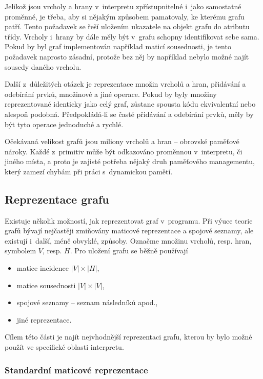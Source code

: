 \documentclass[11pt,twoside,a4paper]{book}
\begin{document}
Jelikož jsou vrcholy a hrany v~interpretu zpřístupnitelné i~jako samostatné proměnné, je třeba, aby si nějakým způsobem pamatovaly, ke kterému grafu patří. Tento požadavek se řeší uložením ukazatele na objekt grafu do atributu třídy. Vrcholy i~hrany by dále měly být v~grafu schopny identifikovat sebe sama. Pokud by byl graf implementován například maticí sousednosti, je tento požadavek naprosto zásadní, protože bez něj by například nebylo možné najít sousedy daného vrcholu.

Další z~důležitých otázek je reprezentace množin vrcholů a hran, přidávání a odebírání prvků, množinové a jiné operace. Pokud by byly množiny reprezentované identicky jako celý graf, zůstane spousta kódu ekvivalentní nebo alespoň podobná. Předpokládá-li se časté přidávání a odebírání prvků, měly by být tyto operace jednoduché a rychlé.

Očekávaná velikost grafů jsou miliony vrcholů a hran -- ob\-rov\-ské pa\-mě\-ťo\-vé nároky. Každé z~primitiv může být odkazováno proměnnou v~interpretu, či jiného místa, a proto je zajisté potřeba nějaký druh paměťového managementu, který zamezí chybám při práci s~dynamickou pamětí.


\subsection{Reprezentace grafu}

Existuje několik možností, jak reprezentovat graf v~programu. Při výuce teorie grafů bývají nejčastěji zmi\-ňo\-vá\-ny maticové reprezentace a spojové seznamy, ale existují i~další, méně obvyklé, způsoby. Označme množinu vrcholů, resp. hran, symbolem $V$, resp. $H$. Pro uložení grafu se běžně používají

\begin{itemize}
\item matice incidence $|V| \times |H|$,
\item matice sousednosti $|V| \times |V|$,
\item spojové seznamy -- seznam následníků apod.,
\item jiné reprezentace.
\end{itemize}

Cílem této části je najít nejvhodnější reprezentaci grafu, kterou by bylo možné použít ve specifické oblasti interpretu.


\subsubsection{Standardní maticové reprezentace}
\end{document}
